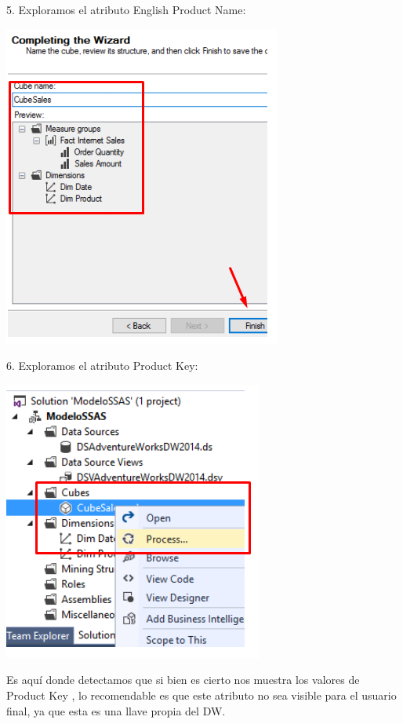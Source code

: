 5. Exploramos el atributo English Product Name:
    \begin{center}
	\includegraphics[width=\columnwidth]{images/task3/img21}
    \end{center}	
 
6. Exploramos el atributo Product Key:

	\begin{center}
	\includegraphics[width=\columnwidth]{images/task4/img22}
    \end{center}	
   
Es aquí donde detectamos que si bien es cierto nos muestra los valores de Product Key , lo recomendable
es que este atributo no sea visible para el usuario final, ya que esta es una llave propia del DW.
	